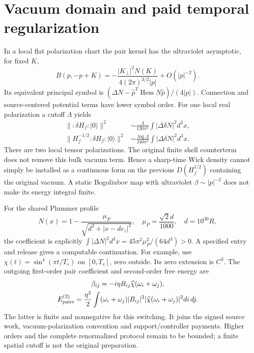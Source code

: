 \section{Vacuum domain and paid temporal regularization}
In a local flat polarization chart the pair kernel has the ultraviolet
asymptotic, for fixed $K$,
\[
 B(p,-p+K)=-\frac{|K_\perp|^2\widehat N(K)}
                       {4(2\pi)^{3/2}|p|}+O(|p|^{-2}).
\]
Its equivalent principal symbol is
$(\Delta N-\hat p^T\operatorname{Hess}N\hat p)/(4|p|)$.
Connection and source-centered potential terms have lower symbol order.
For one local real polarization a cutoff $\Lambda$ yields
\begin{align*}
 \|:\delta H_f:|0\rangle\|^2
   &\sim\frac{\Lambda}{120\pi^2}\int|\Delta\delta N|^2d^3x,\\
 \|H_f^{-1/2}:\delta H_f:|0\rangle\|^2
   &\sim\frac{\log\Lambda}{240\pi^2}\int|\Delta\delta N|^2d^3x.
\end{align*}
There are two local tensor polarizations.  The original finite shell
counterterm does not remove this bulk vacuum term.  Hence a sharp-time
Wick density cannot simply be installed as a continuous form on the
previous $D(H_f^{1/2})$ containing the original vacuum.  A static
Bogoliubov map with ultraviolet $\beta\sim|p|^{-2}$ does not make its
energy integral finite.

For the shared Plummer profile
\[
 N(x)=1-\frac{\mu_P}{\sqrt{d^2+|x-de_z|^2}},\quad
 \mu_P=\frac{\sqrt 2 d}{1000},\quad d=10^{30}R,
\]
the coefficient is explicitly
$\int|\Delta N|^2d^3x=45\pi^2\mu_P^2/(64d^3)>0$.
A specified entry and release gives a computable continuation.
For example, use $\chi(t)=\sin^4(\pi t/T_s)$ on $[0,T_s]$, zero outside.
Its zero extension is $C^3$.
The outgoing first-order pair coefficient and second-order free energy are
\[
 \begin{gathered}
 \beta_{ij}=-i\eta B_{ij}\widehat\chi(\omega_i+\omega_j),\\
 E_{\rm pairs}^{(2)}=\frac{\eta^2}{2}\int(\omega_i+\omega_j)|B_{ij}|^2
                   |\widehat\chi(\omega_i+\omega_j)|^2di\,dj.
 \end{gathered}
\]
The latter is finite and nonnegative for this switching.  It joins the
signed source work, vacuum-polarization convention and support/controller
payments.  Higher orders and the complete renormalized protocol remain
to be bounded; a finite spatial cutoff is not the original preparation.

